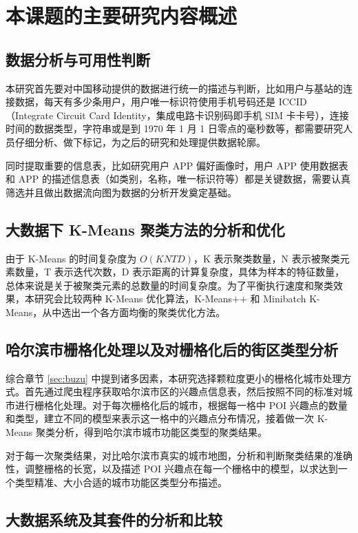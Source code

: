 \section{本课题的主要研究内容概述}

\subsection{数据分析与可用性判断}

本研究首先要对中国移动提供的数据进行统一的描述与判断，比如用户与基站的连接数据，每天有多少条用户，用户唯一标识符使用手机号码还是 ICCID（Integrate Circuit Card Identity，集成电路卡识别码即手机 SIM 卡卡号），连接时间的数据类型，字符串或是到 1970 年 1 月 1 日零点的毫秒数等，都需要研究人员仔细分析、做下标记，为之后的研究和处理提供数据轮廓。

同时提取重要的信息表，比如研究用户 APP 偏好画像时，用户 APP 使用数据表和 APP 的描述信息表（如类别，名称，唯一标识符等）都是关键数据，需要认真筛选并且做出数据流向图为数据的分析开发奠定基础。

\subsection{大数据下 K-Means 聚类方法的分析和优化}

由于 K-Means 的时间复杂度为 $O(KNTD)$，K 表示聚类数量，N 表示被聚类元素数量，T 表示迭代次数，D 表示距离的计算复杂度，具体为样本的特征数量，总体来说是关于被聚类元素的总数量的时间复杂度。为了平衡执行速度和聚类效果，本研究会比较两种 K-Means 优化算法，K-Means++ 和 Minibatch K-Means，从中选出一个各方面均衡的聚类优化方法。

\subsection{哈尔滨市栅格化处理以及对栅格化后的街区类型分析}
\label{sec:xu:block_type}

综合章节 \ref{sec:buzu} 中提到诸多因素，本研究选择颗粒度更小的栅格化城市处理方式。首先通过爬虫程序获取哈尔滨市区的兴趣点信息表，然后按照不同的标准对城市进行栅格化处理。对于每次栅格化后的城市，根据每一格中 POI 兴趣点的数量和类型，建立不同的模型来表示这一格中的兴趣点分布情况，接着做一次 K-Means 聚类分析，得到哈尔滨市城市功能区类型的聚类结果。

对于每一次聚类结果，对比哈尔滨市真实的城市地图，分析和判断聚类结果的准确性，调整栅格的长宽，以及描述 POI 兴趣点在每一个栅格中的模型，以求达到一个类型精准、大小合适的城市功能区类型分布描述。

\subsection{大数据系统及其套件的分析和比较}

